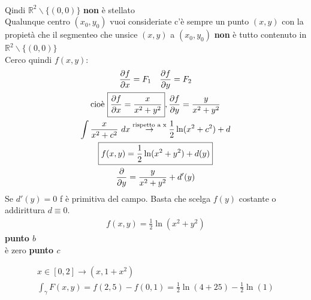 \documentclass[a4paper, oneside]{article}
\begin{document}
\begin{example}
\begin{gather*}
\end{gather*}
Qindi $\mathbb{R}^2 \backslash \{(0,0)\}$ \textbf{non} è stellato\\
Qualunque centro $(x_0,y_0)$ vuoi consideriate c'è sempre un punto $(x,y)$ con la propietà che il segmenteo che unsice $(x,y)$ a $(x_0,y_0)$ \textbf{non} è tutto contenuto in $\mathbb{R}^2 \backslash \{(0,0)\}$\\
Cerco quindi $f(x,y)$:
\begin{gather*}
    \frac{\partial f}{\partial x} = F_1 \quad \frac{\partial f}{\partial y} = F_2\\
    \text{cioè } \boxed{\frac{\partial f}{\partial x} = \frac{x}{x^2+y^2}} , \frac{\partial f}{\partial y} = \frac{y}{x^2+y^2}\\
    \int \frac{x}{x^2+c^2} \ dx \overset{\tiny \text{rispetto a x}\normalsize}{\to} \frac{1}{2} \ln(x^2+c^2) + d\\
    \boxed{f(x,y) = \frac{1}{2} \ln(x^2+y^2) + d(y)}\\
    \frac{\partial}{\partial y} = \frac{y}{x^2 + y^2} + d'(y)\\
\end{gather*}
Se $d'(y) = 0$ f è primitiva del campo. Basta che scelga $f(y)$ costante o addirittura $d\equiv 0$.
\begin{gather*}
    f(x,y) = \frac{1}{2} \ln(x^2+y^2)
\end{gather*}
\textbf{punto $b$}\\
è zero
\textbf{punto $c$}\\
\begin{center}
\end{center}
\begin{gather*}
    x \in [0,2] \to (x, 1+x^2)\\
    \int_{\gamma} F(x,y) = f(2,5) - f(0,1) = \frac{1}{2} \ln(4+25) -\frac{1}{2} \ln(1) 
\end{gather*}
\end{example}
\end{document}
